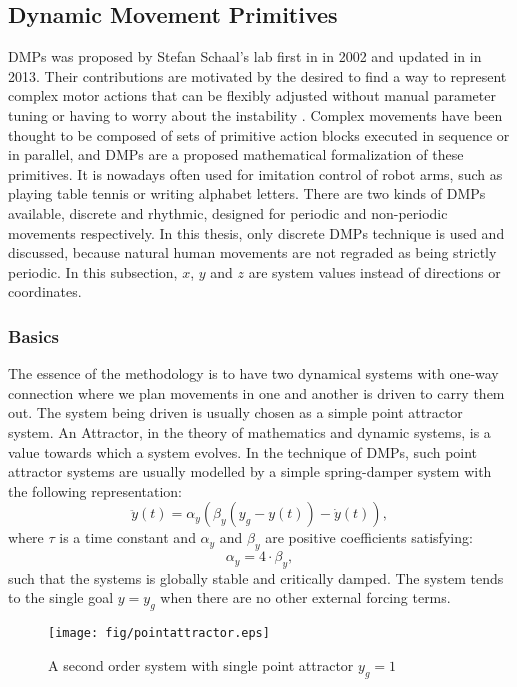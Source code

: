 \subsection{Dynamic Movement Primitives}
\label{dmp}
\ac{DMPs} was proposed by Stefan Schaal's lab first in \cite{schaal2006dynamic} in 2002 and updated in \cite{ijspeert2013dynamical} in 2013. Their contributions are motivated by the desired to find a way to represent complex motor actions that can be flexibly adjusted without manual parameter tuning or having to worry about the instability \cite{schaal2006dynamic}. Complex movements have been thought to be composed of sets of primitive action blocks executed in sequence or in parallel, and DMPs are a proposed mathematical formalization of these primitives. It is nowadays often used for imitation control of robot arms\cite{kober2010movement, mulling2013learning, kulvicius2012joining}, such as playing table tennis or writing alphabet letters. There are two kinds of DMPs available, discrete and rhythmic, designed for periodic and non-periodic movements respectively. In this thesis, only discrete DMPs technique is used and discussed, because natural human movements are not regraded as being strictly periodic. In this subsection, $ x $, $ y $ and $ z $ are system values instead of directions or coordinates.


\subsubsection{Basics}
The essence of the methodology is to have two dynamical systems with one-way connection where we plan movements in one and another is driven to carry them out. The system being driven is usually chosen as a simple point attractor system. An Attractor, in the theory of mathematics and dynamic systems, is a value towards which a system evolves. In the technique of DMPs, such point attractor systems are usually modelled by a simple spring-damper system with the following representation:
\begin{equation}
\label{2ndordersystem}
\ddot{y}(t)=\alpha_y\left(\beta_y(y_g-y(t))-\dot{y}(t)\right),
\end{equation}
where $\tau$ is a time constant and $\alpha_y$ and $\beta_y$ are positive coefficients satisfying:
\begin{equation}
\alpha_y=4\cdot\beta_y,
\end{equation}
such that the systems is globally stable and critically damped. The system tends to the single goal $y=y_g$ when there are no other external forcing terms. 
\begin{figure}[H]
	\centering
	\texttt{[image: fig/pointattractor.eps]}
	\caption{A second order system with single point attractor $y_g = 1$}
	\label{pointattractor}
\end{figure}

